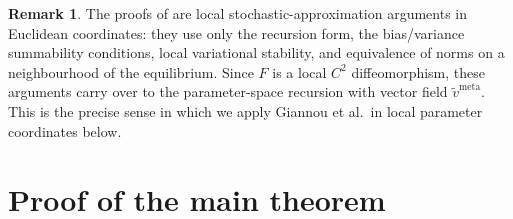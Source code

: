 \documentclass[11pt]{article}
\theoremstyle{definition}
\newtheorem{remark}[theorem]{Remark}
\newcommand{\meta}{\mathrm{meta}}
\begin{document}
\begin{remark}\label{rem:chart-transfer}
The proofs of \cite[Theorem~1 and §4]{Giannou2022} are local stochastic-approximation arguments in Euclidean coordinates: they use only the recursion form, the bias/variance summability conditions, local variational stability, and equivalence of norms on a neighbourhood of the equilibrium. Since $F$ is a local $C^2$ diffeomorphism, these arguments carry over to the parameter-space recursion with vector field $\widetilde v^\meta$. This is the precise sense in which we apply Giannou et al.\ in local parameter coordinates below.
\end{remark}

\section{Proof of the main theorem}
\end{document}
